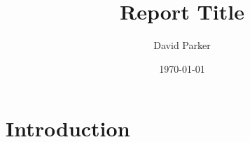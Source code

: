 \documentclass[12pt]{article}
\title{Report Title}
\author{David Parker}
\date{\today}
\begin{document}




\setcounter{tocdepth}{2}
\tableofcontents{}
\pagebreak



\section{Introduction} \label{sec:intro}

\end{document}
